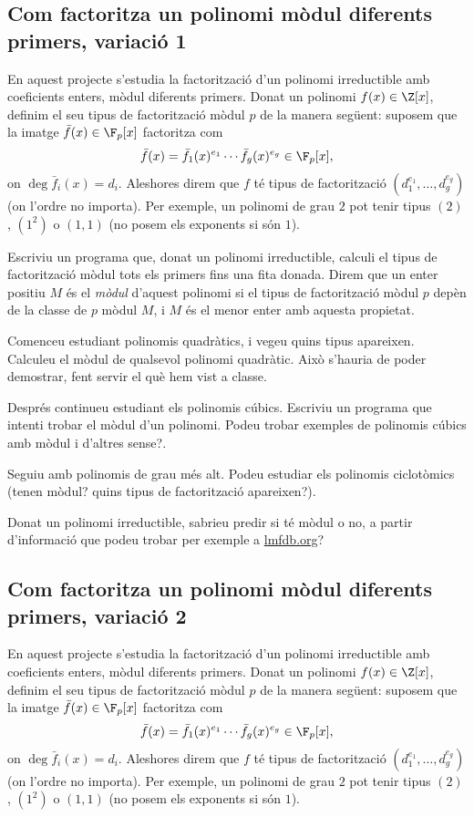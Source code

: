 \subsection{Com factoritza un polinomi mòdul diferents primers, variació 1}
 
 En aquest projecte s'estudia la factorització d'un polinomi irreductible amb coeficients enters, mòdul diferents primers. Donat un polinomi $f(x)\in\Z[x]$, definim el seu tipus de factorització mòdul $p$ de la manera següent: suposem que la imatge $\bar f(x)\in \F_p[x]$ factoritza com
 \[
 \bar f(x)= \bar f_1(x)^{e_1}\cdots \bar f_g(x)^{e_g}\in \F_p[x],
 \]
 on $\deg \bar f_i(x)= d_i$. Aleshores direm que $f$ té tipus de factorització $(d_1^{e_1},\ldots,d_g^{e_g})$ (on l'ordre no importa). Per exemple, un polinomi de grau $2$ pot tenir tipus $(2)$, $(1^2)$ o $(1,1)$ (no posem els exponents si són $1$).

 Escriviu un programa que, donat un polinomi irreductible, calculi el tipus de factorització mòdul tots els primers fins una fita donada. Direm que un enter positiu $M$ és el \emph{mòdul} d'aquest polinomi si el tipus de factorització mòdul $p$ depèn de la classe de $p$ mòdul $M$, i $M$ és el menor enter amb aquesta propietat.
 
 Comenceu estudiant polinomis quadràtics, i vegeu quins tipus apareixen. Calculeu el mòdul de qualsevol polinomi quadràtic. Això s'hauria de poder demostrar, fent servir el què hem vist a classe.
 
 Després continueu estudiant els polinomis cúbics. Escriviu un programa que intenti trobar el mòdul d'un polinomi. Podeu trobar exemples de polinomis cúbics amb mòdul i d'altres sense?.
 
 Seguiu amb polinomis de grau més alt. Podeu estudiar els polinomis ciclotòmics (tenen mòdul? quins tipus de factorització apareixen?).
 
 Donat un polinomi irreductible, sabrieu predir si té mòdul o no, a partir d'informació que podeu trobar per exemple a \url{lmfdb.org}?
 
 \subsection{Com factoritza un polinomi mòdul diferents primers, variació 2}
 
 En aquest projecte s'estudia la factorització d'un polinomi irreductible amb coeficients enters, mòdul diferents primers. Donat un polinomi $f(x)\in\Z[x]$, definim el seu tipus de factorització mòdul $p$ de la manera següent: suposem que la imatge $\bar f(x)\in \F_p[x]$ factoritza com
 \[
 \bar f(x)= \bar f_1(x)^{e_1}\cdots \bar f_g(x)^{e_g}\in \F_p[x],
 \]
 on $\deg \bar f_i(x)= d_i$. Aleshores direm que $f$ té tipus de factorització $(d_1^{e_1},\ldots,d_g^{e_g})$ (on l'ordre no importa). Per exemple, un polinomi de grau $2$ pot tenir tipus $(2)$, $(1^2)$ o $(1,1)$ (no posem els exponents si són $1$).
 
